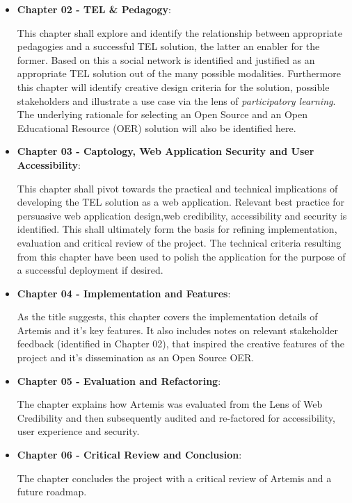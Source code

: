 \begin{itemize}

\item\textbf{Chapter 02 - TEL \& Pedagogy}:

This chapter shall explore and identify the relationship between appropriate pedagogies and a successful TEL solution, the latter an enabler for the former. Based on this a social network is identified and justified as an appropriate TEL solution out of the many possible modalities. Furthermore this chapter will identify creative design criteria for the solution, possible stakeholders and illustrate a use case via the lens of \textit{participatory learning}. The underlying rationale for selecting an Open Source and an Open Educational Resource (OER)  solution will also be identified here.


\item\textbf {Chapter 03 - Captology, Web Application Security and User Accessibility}:

This chapter shall pivot towards the practical and technical implications of developing the TEL solution as a web application. Relevant best practice for persuasive web application design,web credibility, accessibility and security is identified. This shall ultimately form the basis for refining implementation, evaluation and critical review of the project. The technical criteria resulting from this chapter have been used to polish the application for the  purpose of a successful deployment if desired.


\item\textbf {Chapter 04 - Implementation and Features}:

As the title suggests, this chapter covers the implementation details of Artemis and it's key features. It also includes notes on relevant stakeholder feedback (identified in Chapter 02), that inspired the creative features of the project and it's dissemination as an Open Source OER.

\item\textbf {Chapter 05 - Evaluation and Refactoring}:

The chapter explains how Artemis was evaluated from the Lens of Web Credibility and then subsequently audited and re-factored for accessibility, user experience and security. 

\item\textbf {Chapter 06 - Critical Review and Conclusion}:

The chapter concludes the project with a critical review of Artemis and a future roadmap.

\end{itemize}



